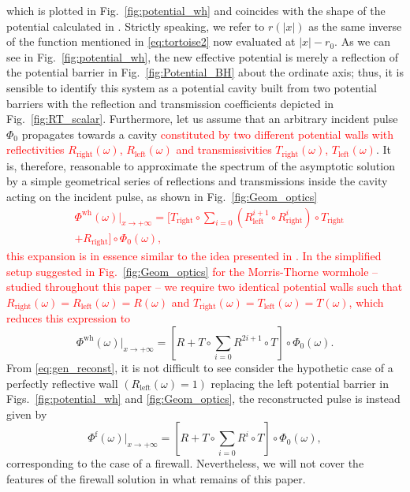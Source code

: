 \documentclass[article,aps,nofootinbib,twocolumn,superscriptaddress]{revtex4-1}
\begin{document}
which is plotted in Fig.~\ref{fig:potential_wh} and coincides with the shape of the potential calculated in \citep{Cardoso:2016oxy}. Strictly speaking, we refer to $r\left(|x|\right)$ as the same inverse of the function mentioned in \eqref{eq:tortoise2} now evaluated at $|x|-r_0$. As we can see in Fig.~\ref{fig:potential_wh}, the new effective potential is merely a reflection of the potential barrier in Fig.~\ref{fig:Potential_BH} about the ordinate axis; thus, it is sensible to identify this system as a potential cavity built from two potential barriers with the reflection and transmission coefficients depicted in Fig.~\ref{fig:RT_scalar}. Furthermore, let us assume that an arbitrary incident pulse $\Phi_0$ propagates towards a cavity \textcolor{red}{constituted by two different potential walls with reflectivities $R_{\mathrm{right}}(\omega)$, $R_{\mathrm{left}}(\omega)$ and transmissivities $T_{\mathrm{right}}(\omega)$, $T_{\mathrm{left}}(\omega)$}. It is, therefore, reasonable to approximate the spectrum of the asymptotic solution by a simple geometrical series of reflections and transmissions inside the cavity acting on the incident pulse, as shown in Fig.~\ref{fig:Geom_optics} 
\textcolor{red}{
\begin{eqnarray}
&\Phi^{\mathrm{wh}}(\omega)|_{x\rightarrow+\infty}=\bigg[T_{\mathrm{right}}\circ\displaystyle{\sum_{i=0}}\left(R_{\mathrm{left}}^{i+1}\circ R_{\mathrm{right}}^{i}\right) \circ T_{\mathrm{right}}\nonumber\\
&+R_{\mathrm{right}}\bigg]\circ\Phi_0(\omega),
\label{eq:gen_reconst}
\end{eqnarray}
this expansion is in essence similar to the idea presented in \citep{Correia:2018apm}. In the simplified setup suggested in Fig.~\ref{fig:Geom_optics} for the Morris-Thorne wormhole -- studied throughout this paper -- we require two identical potential walls such that $R_{\mathrm{right}}(\omega)=R_{\mathrm{left}}(\omega)=R(\omega)$ and $T_{\mathrm{right}}(\omega)=T_{\mathrm{left}}(\omega)=T(\omega)$, which reduces this expression to}
 \begin{equation}
\Phi^{\mathrm{wh}}(\omega)|_{x\rightarrow+\infty}=\left[R+T\circ\sum_{i=0}R^{2i+1}\circ T\right]\circ\Phi_0(\omega).
\label{eq:reconst}
\end{equation}
From \eqref{eq:gen_reconst}, it is not difficult to see consider the hypothetic case of a perfectly reflective wall $(R_{\mathrm{left}}(\omega)=1)$ replacing the left potential barrier in Figs.~\ref{fig:potential_wh} and \ref{fig:Geom_optics}, the reconstructed pulse is instead given by 
\begin{equation}
\Phi^{\mathrm{f}}(\omega)|_{x\rightarrow+\infty}=\left[R+T\circ\sum_{i=0}R^i\circ T\right]\circ\Phi_0(\omega),
\label{eq:reconst_firewall}
\end{equation}
corresponding to the case of a firewall. Nevertheless, we will not cover the features of the firewall solution in what remains of this paper. 
\end{document}
